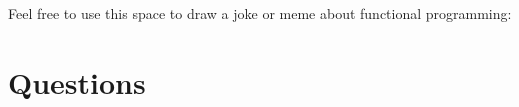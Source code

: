 \documentclass[addpoints,12pt]{exam}
\begin{document}
\vspace{\fill}

\begin{center}
  Feel free to use this space to draw a joke or meme about functional programming: \\

  \vspace{10pt}

  \fbox{\rule{6in}{0pt}\rule[-0.5ex]{0pt}{2.5in}}
\end{center}


\newpage


\section*{Questions}
\end{document}
